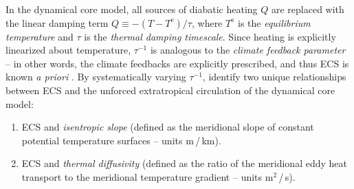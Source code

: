 \documentclass[12pt]{article}
\begin{document}
  In the dynamical core model,
  all sources of diabatic heating $Q$ are replaced with
  the linear damping term $Q \equiv -(T - T^{\mathrm{e}}) / \tau$,
  where $T^{\mathrm{e}}$ is the \textit{equilibrium temperature}
  and $\tau$ is the \textit{thermal damping timescale}.
  Since heating is explicitly linearized about temperature,
  $\tau^{-1}$
  is analogous to the
  \textit{climate feedback parameter} --
  in other words,
  the climate feedbacks
  are explicitly prescribed,
  and thus ECS
  is known \textit{a priori}
  \citep{davis_relationships_nodate}.
  By systematically varying $\tau^{-1}$,
  \citet{davis_relationships_nodate} identify
  two unique relationships between ECS and the
  unforced extratropical circulation
  of the dynamical core model:
  \begin{enumerate}
    \item
      ECS and \textit{isentropic slope} (defined as the meridional slope
      of constant potential temperature surfaces -- units m$\,$/$\,$km).
    \item
      ECS and \textit{thermal diffusivity} (defined as the ratio of the
      meridional eddy heat transport to the meridional temperature gradient --
      units m$^{2}\,$/$\,$s).
  \end{enumerate}
\end{document}
